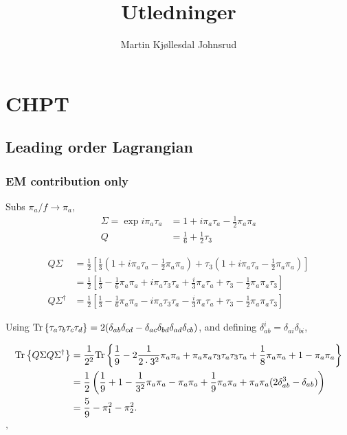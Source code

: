 \documentclass{book}
\title{\huge{Utledninger}}
\author{
    \large{Martin Kjøllesdal Johnsrud }
    }
\begin{document}
\maketitle
\setlength{\parindent}{0em}
\setlength{\parskip}{0.8em}

\chapter{CHPT}
\section{Leading order Lagrangian}

\subsection{EM contribution only}
Subs $\pi_a / f \rightarrow \pi_a$,
\begin{align}
    \Sigma = \exp{i \pi_a \tau_a}
    & = 1 + i\pi_a\tau_a - \frac{1}{2}\pi_a \pi_a \\
    Q 
    & = \frac{1}{6} + \frac{1}{2} \tau_3
\end{align}

\begin{align}
    Q\Sigma 
    & = 
    \frac{1}{2}
    \left[
        \frac{1}{3} 
        \left(
            1 + i\pi_a\tau_a - \frac{1}{2}\pi_a \pi_a
        \right)
        +
        \tau_3
        \left(
            1 + i\pi_a\tau_a - \frac{1}{2}\pi_a \pi_a
        \right)
    \right] \\
    & = 
    \frac{1}{2}
    \left[
        \frac{1}{3} 
        - \frac{1}{6}\pi_a \pi_a
        + i \pi_a \tau_3 \tau_a
        + \frac{i}{3}  \pi_a \tau_a
        + \tau_3
        - \frac{1}{2}\pi_a \pi_a \tau_3 
    \right] \\
    Q \Sigma^\dagger
    & = 
    \frac{1}{2}
    \left[
        \frac{1}{3} 
        - \frac{1}{6}\pi_a \pi_a
        - i \pi_a \tau_3 \tau_a
        - \frac{i}{3}  \pi_a \tau_a
        +\tau_3
        - \frac{1}{2}\pi_a \pi_a \tau_3 
    \right] 
\end{align}


Using $
\text{Tr} \left\{ \tau_a \tau_b \tau_c \tau_d \right\} = 2 (\delta_{ab}\delta_{cd}
 - \delta_{ac}\delta_{bd}
 \delta_{ad}\delta_{cb})
$, and defining $\delta_{ab}^i = \delta_{ai}\delta_{bi}$,

\begin{align}
    \text{Tr} \left\{ Q \Sigma Q \Sigma^\dagger \right\}
    & =
    \frac{1}{2^2}
    \text{Tr} \left\{ 
        \frac{1}{9}
        - 2 \frac{1}{2\cdot 3^2} \pi_a \pi_a
        + \pi_a \pi_a \tau_3 \tau_a\tau_3 \tau_a
        + \frac{1}{8} \pi_a \pi_a
        + 1
        - \pi_a\pi_a
     \right\} \\
    & = 
    \frac{1}{2}
    \left(
        \frac{1}{9}
        + 1
        - \frac{1}{3^2} \pi_a \pi_a
        - \pi_a \pi_a
        + \frac{1}{9} \pi_a \pi_a
        + \pi_a \pi_a(2 \delta_{ab}^3 - \delta_{ab})
    \right) \\
    &
    = \frac{5}{9} - \pi_1^2 - \pi_2^2.
\end{align}'
\end{document}
